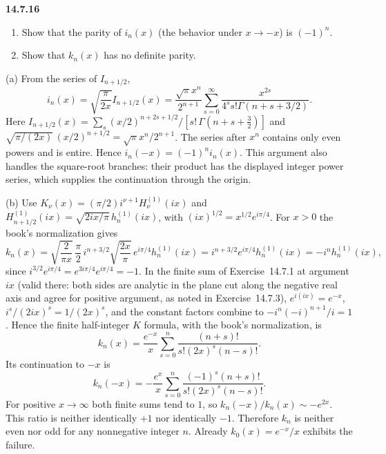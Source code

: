 \par\bigskip
\noindent\textbf{14.7.16}
\begin{enumerate}
\item[(a)] Show that the parity of $i_{n}(x)$ (the behavior under
$x\to-x$) is $(-1)^{n}$.
\item[(b)] Show that $k_{n}(x)$ has no definite parity.
\end{enumerate}
\solution
(a) From the series of $I_{n+1/2}$,
\[
i_n(x)=\sqrt{\frac\pi{2x}}I_{n+1/2}(x)
=\frac{\sqrt\pi x^n}{2^{n+1}}
\sum_{s=0}^\infty\frac{x^{2s}}{4^ss!\Gamma(n+s+3/2)}.
\]
Here $I_{n+1/2}(x)=\sum_s(x/2)^{n+2s+1/2}/[s!\,\Gamma(n+s+\frac32)]$
and $\sqrt{\pi/(2x)}\,(x/2)^{n+1/2}=\sqrt\pi x^n/2^{n+1}$.
The series after $x^n$ contains only even powers and is entire.
Hence $i_n(-x)=(-1)^ni_n(x)$. This argument also handles the
square-root branches: their product has the displayed integer
power series, which supplies the continuation through the origin.

(b) Use $K_\nu(x)=(\pi/2)i^{\nu+1}H_\nu^{(1)}(ix)$ and
$H_{n+1/2}^{(1)}(ix)=\sqrt{2ix/\pi}\,h_n^{(1)}(ix)$, with
$(ix)^{1/2}=x^{1/2}e^{i\pi/4}$. For $x>0$ the book's normalization
gives
\[
k_n(x)=\sqrt{\frac2{\pi x}}\,\frac\pi2\,i^{n+3/2}
\sqrt{\frac{2x}\pi}\,e^{i\pi/4}h_n^{(1)}(ix)
=i^{n+3/2}e^{i\pi/4}h_n^{(1)}(ix)=-i^nh_n^{(1)}(ix),
\]
since $i^{3/2}e^{i\pi/4}=e^{3i\pi/4}e^{i\pi/4}=-1$.
In the finite sum of Exercise~14.7.1 at argument $ix$ (valid
there: both sides are analytic in the plane cut along the negative
real axis and agree for positive argument, as noted in
Exercise~14.7.3),
$e^{i(ix)}=e^{-x}$, $i^s/(2ix)^s=1/(2x)^s$, and the constant
factors combine to $-i^n(-i)^{n+1}/i=1$. Hence the finite
half-integer $K$ formula, with the book's normalization, is
\[
k_n(x)=\frac{e^{-x}}x\sum_{s=0}^n
\frac{(n+s)!}{s!(2x)^s(n-s)!}.
\]
Its continuation to $-x$ is
\[
k_n(-x)=-\frac{e^x}{x}\sum_{s=0}^n
\frac{(-1)^s(n+s)!}{s!(2x)^s(n-s)!}.
\]
For positive $x\to\infty$ both finite sums tend to $1$, so
$k_n(-x)/k_n(x)\sim-e^{2x}$. This ratio is neither identically
$+1$ nor identically $-1$. Therefore $k_n$ is neither even nor
odd for any nonnegative integer $n$. Already
$k_0(x)=e^{-x}/x$ exhibits the failure.

